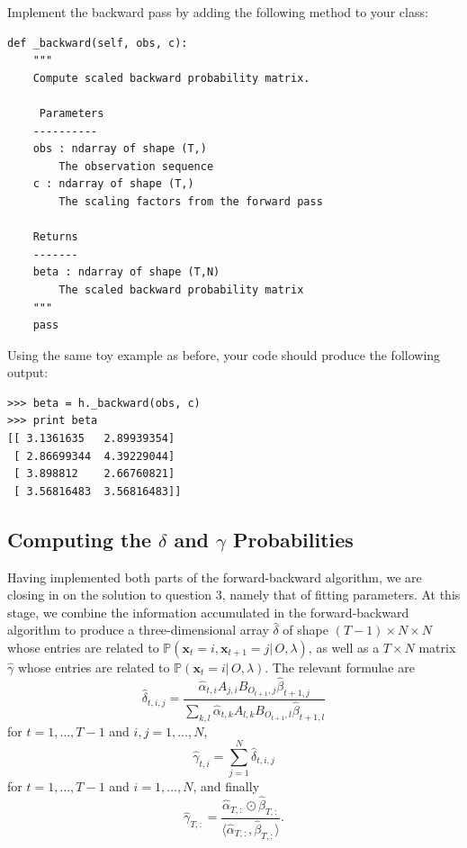 \begin{problem}
Implement the backward pass by adding the following method to your class:
\begin{lstlisting}
def _backward(self, obs, c):
    """
    Compute scaled backward probability matrix.

     Parameters
    ----------
    obs : ndarray of shape (T,)
        The observation sequence
    c : ndarray of shape (T,)
        The scaling factors from the forward pass

    Returns
    -------
    beta : ndarray of shape (T,N)
        The scaled backward probability matrix
    """
    pass
\end{lstlisting}
Using the same toy example as before, your code should produce the following output:
\begin{lstlisting}
>>> beta = h._backward(obs, c)
>>> print beta
[[ 3.1361635   2.89939354]
 [ 2.86699344  4.39229044]
 [ 3.898812    2.66760821]
 [ 3.56816483  3.56816483]]
\end{lstlisting}
\end{problem}

\subsection*{Computing the $\delta$ and $\gamma$ Probabilities}
Having implemented both parts of the forward-backward algorithm, we are closing in on the solution to question 3, namely that of fitting parameters.
At this stage, we combine the information accumulated in the forward-backward algorithm to produce a three-dimensional array $\widehat{\delta}$
of shape $(T-1)\times N \times N$ whose entries are related to $\mathbb{P}(\mathbf{x}_t = i, \mathbf{x}_{t+1} = j|\, O, \lambda)$, as well as
a $T \times N$ matrix $\widehat{\gamma}$ whose entries are related to $\mathbb{P}(\mathbf{x}_t=i | \, O, \lambda)$.
The relevant formulae are
\[
\widehat{\delta}_{t,i,j} = \frac{\widehat{\alpha}_{t,i}A_{j,i}B_{O_{t+1},j}\widehat{\beta}_{t+1,j}}{\sum_{k,l}\widehat{\alpha}_{t,k}A_{l,k}B_{O_{t+1},l}\widehat{\beta}_{t+1,l}}
\]
for $t = 1, \ldots, T-1$ and $i,j = 1, \ldots, N$,
\[
\widehat{\gamma}_{t,i} = \sum_{j=1}^N \widehat{\delta}_{t,i,j}
\]
for $t = 1,\ldots,T-1$ and $i=1,\ldots,N$, and finally
\[
\widehat{\gamma}_{T,:} = \frac{\widehat{\alpha}_{T,:}\odot \widehat{\beta}_{T,:}}{\langle\widehat{\alpha}_{T,:}, \widehat{\beta}_{T,:}\rangle}.
\]

